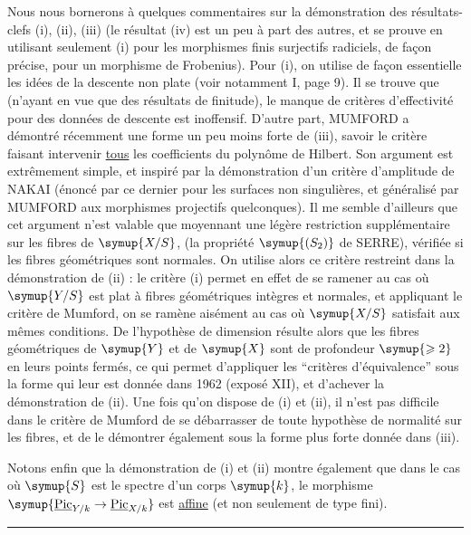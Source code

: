 Nous nous bornerons à quelques commentaires sur la démonstration des
résultats-clefs (i), (ii), (iii) (le résultat (iv) est un peu à part des
autres, et se prouve en utilisant seulement (i) pour les morphismes finis
surjectifs radiciels, de façon précise, pour un morphisme de Frobenius). Pour
(i), on utilise de façon essentielle les idées de la descente non plate (voir
notamment  I, page 9). Il se trouve que (n'ayant en vue que des résultats
de finitude), le manque de critères d'effectivité pour des données de descente
est inoffensif. D'autre part, MUMFORD a démontré récemment une forme un peu
moins forte de (iii), savoir le critère faisant intervenir \uline{tous} les
coefficients du polynôme de Hilbert. Son argument est extrêmement simple, et
inspiré par la démonstration d'un critère d'amplitude de NAKAI (énoncé par ce
dernier pour les surfaces non singulières, et généralisé par MUMFORD aux
morphismes projectifs quelconques). Il me semble d'ailleurs que cet argument
n'est valable que moyennant une légère restriction supplémentaire sur les
fibres de $\symup{X/S}$, (la propriété $\symup{(S_2)}$ de SERRE), vérifiée si les fibres
géométriques sont normales. On utilise alors ce critère restreint dans la
démonstration de (ii) : le critère (i) permet en effet de se ramener au cas où
$\symup{Y/S}$ est plat à fibres géométriques intègres et normales, et appliquant le
critère de Mumford, on se ramène aisément au cas où $\symup{X/S}$ satisfait aux mêmes
conditions. De l'hypothèse de dimension résulte alors que les fibres
géométriques de $\symup{Y}$ et de $\symup{X}$ sont de profondeur $\symup{\geqslant2}$ en leurs points
fermés, ce qui permet d'appliquer les ``critères d'équivalence'' sous la forme
qui leur est donnée dans  1962 (exposé XII), et d'achever la démonstration de
(ii). Une fois qu'on dispose de (i) et (ii), il n'est pas difficile dans le
critère de Mumford de se débarrasser de toute hypothèse de normalité sur les
fibres, et de le démontrer également sous la forme plus forte donnée dans
(iii).

Notons enfin que la démonstration de (i) et (ii) montre également que dans le
cas où $\symup{S}$ est le spectre d'un corps $\symup{k}$, le morphisme
$\symup{\underline{\operatorname{Pic}}_{Y/k}\to \underline{\operatorname{Pic}}_{X/k}}$
est \uline{affine} (et non seulement de type fini).

\par\medskip\begin{center}\rule{4cm}{0.4pt}\end{center}
